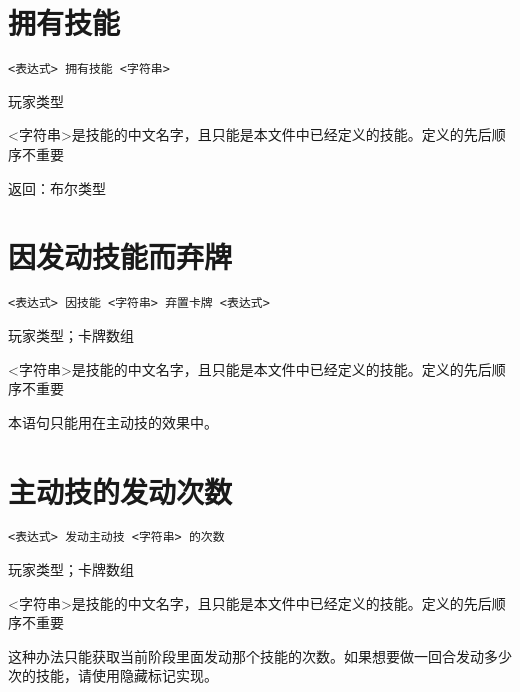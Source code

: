\section{拥有技能}

\begin{verbatim}
<表达式> 拥有技能 <字符串>
\end{verbatim}

玩家类型

<字符串>是技能的中文名字，且只能是本文件中已经定义的技能。定义的先后顺序不重要

返回：布尔类型

\section{因发动技能而弃牌}

\begin{verbatim}
<表达式> 因技能 <字符串> 弃置卡牌 <表达式>
\end{verbatim}

玩家类型；卡牌数组

<字符串>是技能的中文名字，且只能是本文件中已经定义的技能。定义的先后顺序不重要

本语句只能用在主动技的效果中。

\section{主动技的发动次数}

\begin{verbatim}
<表达式> 发动主动技 <字符串> 的次数
\end{verbatim}

玩家类型；卡牌数组

<字符串>是技能的中文名字，且只能是本文件中已经定义的技能。定义的先后顺序不重要

这种办法只能获取当前阶段里面发动那个技能的次数。如果想要做一回合发动多少次的技能，请使用隐藏标记实现。
